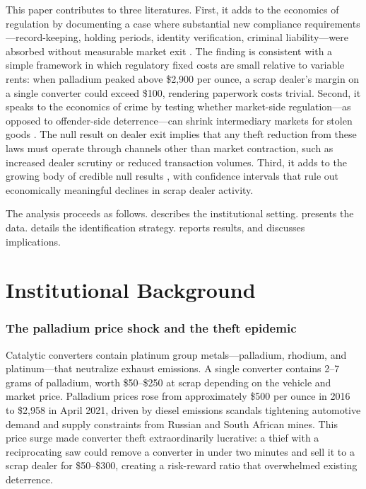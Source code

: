 \documentclass[12pt]{article}
\begin{document}
This paper contributes to three literatures. First, it adds to the economics of regulation by documenting a case where substantial new compliance requirements---record-keeping, holding periods, identity verification, criminal liability---were absorbed without measurable market exit \citep{stigler1971, peltzman1976}. The finding is consistent with a simple framework in which regulatory fixed costs are small relative to variable rents: when palladium peaked above \$2,900 per ounce, a scrap dealer's margin on a single converter could exceed \$100, rendering paperwork costs trivial. Second, it speaks to the economics of crime by testing whether market-side regulation---as opposed to offender-side deterrence---can shrink intermediary markets for stolen goods \citep{becker1968, levitt2004}. The null result on dealer exit implies that any theft reduction from these laws must operate through channels other than market contraction, such as increased dealer scrutiny or reduced transaction volumes. Third, it adds to the growing body of credible null results \citep{abadie2020}, with confidence intervals that rule out economically meaningful declines in scrap dealer activity.

The analysis proceeds as follows.  describes the institutional setting.  presents the data.  details the identification strategy.  reports results, and  discusses implications.


\section{Institutional Background}\label{sec:background}

\subsubsection*{The palladium price shock and the theft epidemic} Catalytic converters contain platinum group metals---palladium, rhodium, and platinum---that neutralize exhaust emissions. A single converter contains 2--7 grams of palladium, worth \$50--\$250 at scrap depending on the vehicle and market price. Palladium prices rose from approximately \$500 per ounce in 2016 to \$2,958 in April 2021, driven by diesel emissions scandals tightening automotive demand and supply constraints from Russian and South African mines. This price surge made converter theft extraordinarily lucrative: a thief with a reciprocating saw could remove a converter in under two minutes and sell it to a scrap dealer for \$50--\$300, creating a risk-reward ratio that overwhelmed existing deterrence.
\end{document}
